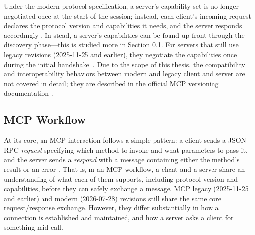 \documentclass[english, 12pt, a4paper, elec, utf8, a-2b, online]{aaltothesis}
\begin{document}
Under the modern protocol specification, a server's capability set is no longer negotiated once at the start of the session; instead, each client's incoming request declares the protocol version and capabilities it needs, and the server responds accordingly \cite{mcpspec2026, mcpversioning2026}.
In stead, a server's capabilities can be found up front through the discovery phase—this is studied more in Section \ref{sec:mcp_workflow}.
For servers that still use legacy revisions (2025-11-25 and earlier), they negotiate the capabilities once during the initial handshake~\cite{mcpversioning2026}.
Due to the scope of this thesis, the compatibility and interoperability behaviors between modern and legacy client and server are not covered in detail; they are described in the official MCP versioning documentation \cite{mcpversioning2026}.

\subsection{MCP Workflow}
\label{sec:mcp_workflow}
At its core, an MCP interaction follows a simple pattern: a client sends a JSON-RPC \emph{request} specifying which method to invoke and what parameters to pass it, and the server sends a \emph{respond} with a message containing either the method's result or an error \cite{mcpspec2026}. 
That is, in an MCP workflow, a client and a server share an understanding of what each of them supports, including protocol version and capabilities, before they can safely exchange a message. 
MCP legacy (2025-11-25 and earlier) and modern (2026-07-28) revisions still share the same core request/response exchange. 
However, they differ substantially in how a connection is established and maintained, and how a server asks a client for something mid-call. 
\end{document}
